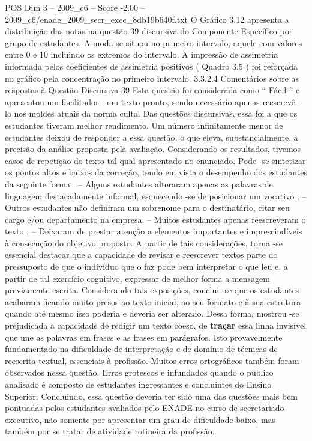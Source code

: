 \begin{textsample}{POS Dim 3 – 2009\_c6 – Score -2.00 – 2009\_c6/enade\_2009\_secr\_exec\_8db19b640f.txt}
O Gráfico 3.12 apresenta a distribuição das notas na questão 39 discursiva do Componente Específico por grupo de estudantes.
A moda se situou no primeiro intervalo, aquele com valores entre 0 e 10 incluindo os extremos do intervalo.
A impressão de assimetria informada pelos coeficientes de assimetria positivos ( Quadro 3.5 ) foi reforçada no gráfico pela concentração no primeiro intervalo. 3.3.2.4 Comentários sobre as respostas à Questão Discursiva 39 Esta questão foi considerada como “ Fácil ” e apresentou um facilitador : um texto pronto, sendo necessário apenas reescrevê -lo nos moldes atuais da norma culta.
Das questões discursivas, essa foi a que os estudantes tiveram melhor rendimento.
Um número infinitamente menor de estudantes deixou de responder a essa questão, o que eleva, substancialmente, a precisão da análise proposta pela avaliação.
Considerando os resultados, tivemos casos de repetição do texto tal qual apresentado no enunciado.
Pode -se sintetizar os pontos altos e baixos da correção, tendo em vista o desempenho dos estudantes da seguinte forma : – Alguns estudantes alteraram apenas as palavras de linguagem destacadamente informal, esquecendo -se de posicionar um vocativo ; – Outros estudantes não definiram um sobrenome para o destinatário, citar seu cargo e/ou departamento na empresa. – Muitos estudantes apenas reescreveram o texto ; – Deixaram de prestar atenção a elementos importantes e imprescindíveis à consecução do objetivo proposto.
A partir de tais considerações, torna -se essencial destacar que a capacidade de revisar e reescrever textos parte do pressuposto de que o indivíduo que o faz pode bem interpretar o que leu e, a partir de tal exercício cognitivo, expressar de melhor forma a mensagem previamente escrita.
Considerando tais exposições, conclui -se que os estudantes acabaram ficando muito presos ao texto inicial, ao seu formato e à sua estrutura quando até mesmo isso poderia e deveria ser alterado.
Dessa forma, mostrou -se prejudicada a capacidade de redigir um texto coeso, de \textbf{traçar} essa linha invisível que une as palavras em frases e as frases em parágrafos.
Isto provavelmente fundamentado na dificuldade de interpretação e de domínio de técnicas de reescrita textual, essenciais à profissão.
Muitos erros ortográficos também foram observados nessa questão.
Erros grotescos e infundados quando o público analisado é composto de estudantes ingressantes e concluintes do Ensino Superior.
Concluindo, essa questão deveria ter sido uma das questões mais bem pontuadas pelos estudantes avaliados pelo ENADE no curso de secretariado executivo, não somente por apresentar um grau de dificuldade baixo, mas também por se tratar de atividade rotineira da profissão.

\end{textsample}
